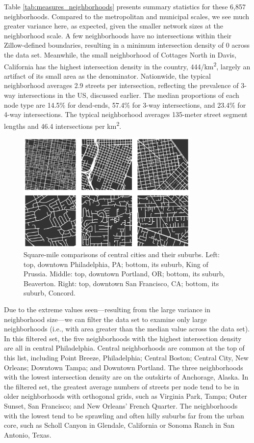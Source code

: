 \documentclass[11pt]{article}
\begin{document}
\begin{multicols}{2}
Table \ref{tab:measures_neighborhoods} presents summary statistics for these 6,857 neighborhoods. Compared to the metropolitan and municipal scales, we see much greater variance here, as expected, given the smaller network sizes at the neighborhood scale. A few neighborhoods have no intersections within their Zillow-defined boundaries, resulting in a minimum intersection density of 0 across the data set. Meanwhile, the small neighborhood of Cottages North in Davis, California has the highest intersection density in the country, 444/km\textsuperscript{2}, largely an artifact of its small area as the denominator. Nationwide, the typical neighborhood averages 2.9 streets per intersection, reflecting the prevalence of 3-way intersections in the US, discussed earlier. The median proportions of each node type are 14.5\% for dead-ends, 57.4\% for 3-way intersections, and 23.4\% for 4-way intersections. The typical neighborhood averages 135-meter street segment lengths and 46.4 intersections per km\textsuperscript{2}.

\begin{figure}[htbp]
	\centering
	\includegraphics[width=0.8\textwidth]{fig05.png}
	\caption{Square-mile comparisons of central cities and their suburbs. Left: top, downtown Philadelphia, PA; bottom, its suburb, King of Prussia. Middle: top, downtown Portland, OR; bottom, its suburb, Beaverton. Right: top, downtown San Francisco, CA; bottom, its suburb, Concord.}
	\label{fig:fig05}
\end{figure}

Due to the extreme values seen---resulting from the large variance in neighborhood size---we can filter the data set to examine only large neighborhoods (i.e., with area greater than the median value across the data set). In this filtered set, the five neighborhoods with the highest intersection density are all in central Philadelphia. Central neighborhoods are common at the top of this list, including Point Breeze, Philadelphia; Central Boston; Central City, New Orleans; Downtown Tampa; and Downtown Portland. The three neighborhoods with the lowest intersection density are on the outskirts of Anchorage, Alaska. In the filtered set, the greatest average numbers of streets per node tend to be in older neighborhoods with orthogonal grids, such as Virginia Park, Tampa; Outer Sunset, San Francisco; and New Orleans' French Quarter. The neighborhoods with the lowest tend to be sprawling and often hilly suburbs far from the urban core, such as Scholl Canyon in Glendale, California or Sonoma Ranch in San Antonio, Texas.


\end{multicols}
\end{document}
